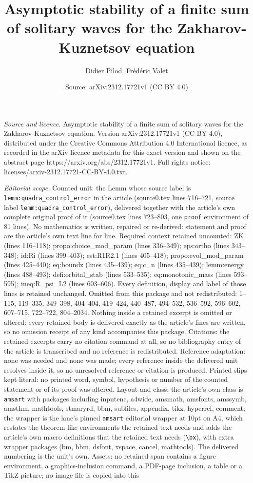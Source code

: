 \documentclass[10pt,a4paper]{amsart}
\title[Asymptotic stability of a finite sum of solitary waves for t]{Asymptotic stability of a finite sum of solitary waves for the Zakharov-Kuznetsov equation}
\author{Didier Pilod, Fr\'ed\'eric Valet}
\date{Source: arXiv:2312.17721v1 (CC BY 4.0)}
\begin{document}
\maketitle

\noindent\emph{Source and licence.} Asymptotic stability of a finite sum of solitary waves for the Zakharov-Kuznetsov equation. Version arXiv:2312.17721v1 (CC BY 4.0), distributed under the Creative Commons Attribution 4.0 International licence, as recorded in the arXiv licence metadata for this exact version and shown on the abstract page https://arxiv.org/abs/2312.17721v1. Full rights notice: licenses/arxiv-2312.17721-CC-BY-4.0.txt.\par\smallskip

\noindent\textit{Editorial scope.} Counted unit: the Lemm whose source label is \texttt{lemm:quadra\_control\_error} in the article (source0.tex lines 716--721, source label \texttt{lemm:quadra\_control\_error}), delivered together with the article's own complete original proof of it (source0.tex lines 723--803, one \texttt{proof} environment of 81 lines). No mathematics is written, repaired or re-derived: statement and proof are the article's own text line for line. Required context retained uncounted: ZK (lines 116--118); propo:choice\_mod\_param (lines 336--349); eps:ortho (lines 343--348); id:Ri (lines 399--403); est:R1R2.1 (lines 405--418); propo:evol\_mod\_param (lines 425--440); eq:boundz (lines 435--439); eq:c\_n (lines 435--439); lemm:energy (lines 488--493); defi:orbital\_stab (lines 533--535); eq:monotonic\_mass (lines 593--595); ineq:R\_psi\_L2 (lines 603--606). Every definition, display and label of those lines is retained unchanged. Omitted from this package and not redistributed: 1--115, 119--335, 349--398, 404--404, 419--424, 440--487, 494--532, 536--592, 596--602, 607--715, 722--722, 804--2034. Nothing inside a retained excerpt is omitted or altered: every retained body is delivered exactly as the article's lines are written, so no omission receipt of any kind accompanies this package. Citations: the retained excerpts carry no citation command at all, so no bibliography entry of the article is transcribed and no reference is redistributed. Reference adaptation: none was needed and none was made; every reference inside the delivered unit resolves inside it, so no unresolved reference or citation is produced. Printed slips kept literal: no printed word, symbol, hypothesis or number of the counted statement or of its proof was altered. Layout and class: the article's own class is \texttt{amsart} with packages including inputenc, a4wide, amsmath, amsfonts, amssymb, amsthm, mathtools, stmaryrd, bbm, subfiles, appendix, tikz, hyperref, comment; the wrapper is the lane's pinned \texttt{amsart} editorial wrapper at 10pt on A4, which restates the theorem-like environments the retained text needs and adds the article's own macro definitions that the retained text needs (\texttt{\textbackslash bx}), with extra wrapper packages (bm, bbm, dsfont, xspace, cancel, mathtools). The delivered numbering is the unit's own. Assets: no retained span contains a figure environment, a graphics-inclusion command, a PDF-page inclusion, a table or a TikZ picture; no image file is copied into this 
\end{document}
